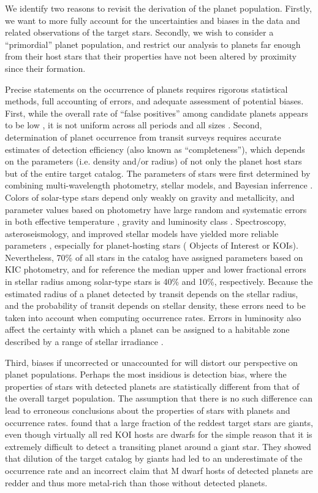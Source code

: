 We identify two reasons to revisit the derivation of the \kep{} planet
population. Firstly, we want to more fully account for the
uncertainties and biases in the \kep{} data and related observations
of the target stars.  Secondly, we wish to consider a ``primordial''
planet population, and restrict our analysis to planets far enough
from their host stars that their properties have not been altered by
proximity since their formation.

Precise statements on the occurrence of planets requires rigorous
statistical methods, full accounting of errors, and adequate
assessment of potential biases.  First, while the overall rate of
``false positives'' among \kep{} candidate planets appears to be low
\citep{Morton2011,Fressin2013}, it is not uniform across all
  periods and all sizes \citep{Santerne2013}.  Second, determination
of planet occurrence from transit surveys requires accurate estimates
of detection efficiency (also known as ``completeness''), which depends on the
parameters (i.e. density and/or radius) of not only the planet host
stars but of the entire target catalog. The parameters of \kep{} stars
were first determined by combining multi-wavelength photometry,
stellar models, and Bayesian inferrence \citep{Brown2011}.  Colors of
solar-type stars depend only weakly on gravity and metallicity, and
parameter values based on photometry have large random and systematic
errors in both effective temperature \citep{Pinsonneault2012}, gravity
and luminosity class \citep{Mann2012}.  Spectroscopy, asteroseismology,
and improved stellar models have yielded more reliable parameters 
\citep{Huber2014}, especially for \kep{} planet-hosting stars 
(\kep{} Objects of Interest or KOIs).  Nevertheless, 70\% of all stars in the
\citet{Huber2014} catalog have assigned parameters based on KIC
photometry, and for reference the median upper and lower fractional errors in stellar
radius among solar-type stars is 40\% and 10\%, respectively. Because
the estimated radius of a planet detected by transit depends on the
stellar radius, and the probability of transit depends on stellar
density, these errors need to be taken into account when computing
occurrence rates.  Errors in luminosity also affect the certainty with
which a planet can be assigned to a habitable zone described by a
range of stellar irradiance \citep{Gaidos2013,Mann2013}.

Third, biases if uncorrected or unaccounted for will distort our
perspective on planet populations.  Perhaps the most insidious is
detection bias, where the properties of stars with detected planets
are statistically different from that of the overall target
population.  The assumption that there is no such difference can lead
to erroneous conclusions about the properties of stars with planets
and occurrence rates.  \citet{Mann2012} found that a large fraction of
the reddest \kep{} target stars are giants, even though virtually all
red KOI hosts are dwarfs for the simple reason that it is extremely
difficult to detect a transiting planet around a giant star.  They
showed that dilution of the target catalog by giants had led to an
underestimate of the occurrence rate and an incorrect claim that M
dwarf hosts of detected planets are redder and thus more metal-rich
than those without detected planets.

